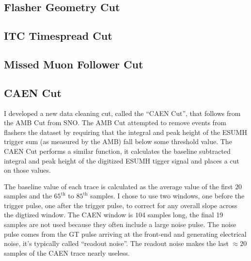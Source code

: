 \subsection{Flasher Geometry Cut}
\subsection{ITC Timespread Cut}
\subsection{Missed Muon Follower Cut}
\subsection{CAEN Cut}
I developed a new data cleaning cut, called the ``CAEN Cut'', that follows from
the AMB Cut from SNO.
The AMB Cut attempted to remove events from flashers the dataset by requiring
that the integral and peak height of the ESUMH trigger sum (as measured by the
AMB) fall below some threshold value.
The CAEN Cut performs a similar function, it calculates the baseline subtracted
integral and peak height of the digitized ESUMH tigger signal and places a cut on those values.

The baseline value of each trace is calculated as the average value of the first
$20$ samples and the $65^{\text{th}}$ to $85^{\text{th}}$ samples.
I chose to use two windows, one before the trigger pulse, one after the trigger pulse, to
correct for any overall slope across the digtized window.
The CAEN window is $104$ samples long, the final 19 samples are not used because they often
include a large noise pulse.
The noise pulse comes from the GT pulse arriving at the front-end and generating electrical noise,
it's typically called ``readout noise''.
The readout noise makes the last $\approx20$ samples of the CAEN trace nearly
useless.

